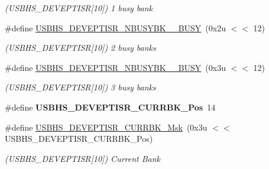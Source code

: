 \begin{DoxyCompactItemize}
\begin{DoxyCompactList}\small\item\em (U\+S\+B\+H\+S\+\_\+\+D\+E\+V\+E\+P\+T\+I\+SR\mbox{[}10\mbox{]}) 1 busy bank \end{DoxyCompactList}\item 
\mbox{\label{group__SAME70__USBHS_gad73f58e4156b8dd35070b4a14408aa20}} 
\#define \mbox{\hyperlink{group__SAME70__USBHS_gad73f58e4156b8dd35070b4a14408aa20}{U\+S\+B\+H\+S\+\_\+\+D\+E\+V\+E\+P\+T\+I\+S\+R\+\_\+\+N\+B\+U\+S\+Y\+B\+K\+\_\+\_\+\+B\+U\+SY}}~(0x2u $<$$<$ 12)
\begin{DoxyCompactList}\small\item\em (U\+S\+B\+H\+S\+\_\+\+D\+E\+V\+E\+P\+T\+I\+SR\mbox{[}10\mbox{]}) 2 busy banks \end{DoxyCompactList}\item 
\mbox{\label{group__SAME70__USBHS_gaa39743799ddb041a3cb76d050d638892}} 
\#define \mbox{\hyperlink{group__SAME70__USBHS_gaa39743799ddb041a3cb76d050d638892}{U\+S\+B\+H\+S\+\_\+\+D\+E\+V\+E\+P\+T\+I\+S\+R\+\_\+\+N\+B\+U\+S\+Y\+B\+K\+\_\+\_\+\+B\+U\+SY}}~(0x3u $<$$<$ 12)
\begin{DoxyCompactList}\small\item\em (U\+S\+B\+H\+S\+\_\+\+D\+E\+V\+E\+P\+T\+I\+SR\mbox{[}10\mbox{]}) 3 busy banks \end{DoxyCompactList}\item 
\mbox{\label{group__SAME70__USBHS_gaf1040327b8d8ee4bfc63394aa1f9b0d7}} 
\#define {\bfseries U\+S\+B\+H\+S\+\_\+\+D\+E\+V\+E\+P\+T\+I\+S\+R\+\_\+\+C\+U\+R\+R\+B\+K\+\_\+\+Pos}~14
\item 
\mbox{\label{group__SAME70__USBHS_ga7c73d2b3727580bd7efba8f42386146a}} 
\#define \mbox{\hyperlink{group__SAME70__USBHS_ga7c73d2b3727580bd7efba8f42386146a}{U\+S\+B\+H\+S\+\_\+\+D\+E\+V\+E\+P\+T\+I\+S\+R\+\_\+\+C\+U\+R\+R\+B\+K\+\_\+\+Msk}}~(0x3u $<$$<$ U\+S\+B\+H\+S\+\_\+\+D\+E\+V\+E\+P\+T\+I\+S\+R\+\_\+\+C\+U\+R\+R\+B\+K\+\_\+\+Pos)
\begin{DoxyCompactList}\small\item\em (U\+S\+B\+H\+S\+\_\+\+D\+E\+V\+E\+P\+T\+I\+SR\mbox{[}10\mbox{]}) Current Bank \end{DoxyCompactList}\item 
\mbox{\label{group__SAME70__USBHS_ga69452e2ef35a964e9d9565a530992986}} 
$$
\end{DoxyCompactItemize}
